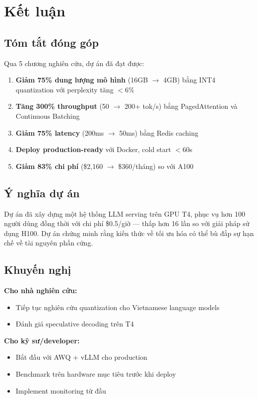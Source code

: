 \documentclass[12pt,a4paper]{report}
\begin{document}
\section{Kết luận}

\subsection{Tóm tắt đóng góp}

Qua 5 chương nghiên cứu, dự án đã đạt được:
\begin{enumerate}
  \item \textbf{Giảm 75\% dung lượng mô hình} (16GB $\rightarrow$ 4GB) bằng INT4 quantization với perplexity tăng $<$6\%
  \item \textbf{Tăng 300\% throughput} (50 $\rightarrow$ 200+ tok/s) bằng PagedAttention và Continuous Batching
  \item \textbf{Giảm 75\% latency} (200ms $\rightarrow$ 50ms) bằng Redis caching
  \item \textbf{Deploy production-ready} với Docker, cold start $<$60s
  \item \textbf{Giảm 83\% chi phí} (\$2,160 $\rightarrow$ \$360/tháng) so với A100
\end{enumerate}

\subsection{Ý nghĩa dự án}

\begin{successbox}
Dự án đã xây dựng một hệ thống LLM serving trên GPU T4, phục vụ hơn 100 người dùng đồng thời với chi phí \$0.5/giờ --- thấp hơn 16 lần so với giải pháp sử dụng H100. Dự án chứng minh rằng kiến thức về tối ưu hóa có thể bù đắp sự hạn chế về tài nguyên phần cứng.
\end{successbox}

\subsection{Khuyến nghị}

\textbf{Cho nhà nghiên cứu:}
\begin{itemize}
  \item Tiếp tục nghiên cứu quantization cho Vietnamese language models
  \item Đánh giá speculative decoding trên T4
\end{itemize}

\textbf{Cho kỹ sư/developer:}
\begin{itemize}
  \item Bắt đầu với AWQ + vLLM cho production
  \item Benchmark trên hardware mục tiêu trước khi deploy
  \item Implement monitoring từ đầu
\end{itemize}
\end{document}
